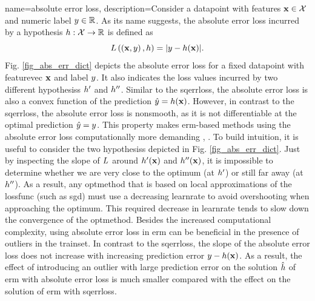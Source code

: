 {name={absolute error loss},
	description={Consider a \gls{datapoint} with \glspl{feature} ${\bf x} \in \mathcal{X}$ and numeric 
		\gls{label} $y \in \mathbb{R}$. As its name suggests, the absolute error \gls{loss} 
		incurred by a \gls{hypothesis} $h: \mathcal{X} \rightarrow \mathbb{R}$ 
		is defined as $$L\left(\left( {\bf x},y \right),h \right) = |y - h({\bf x})|.$$
		Fig. \ref{fig_abs_err_dict} depicts the absolute error \gls{loss} for a fixed \gls{datapoint} 
		with \gls{featurevec} ${\bf x}$ and \gls{label} $y$. It also indicates the \gls{loss} values 
		incurred by two different \glspl{hypothesis} $h'$ and $h''$. Similar to the \gls{sqerrloss}, 
		the absolute error \gls{loss} is also a \gls{convex} \gls{function} of the \gls{prediction} $\hat{y}=h({\bf x})$. 
		However, in contrast to the \gls{sqerrloss}, the absolute error \gls{loss} is \gls{nonsmooth}, as it is not 
		\gls{differentiable} at the optimal \gls{prediction} $\hat{y}=y$. This property 
		makes \gls{erm}-based methods using the absolute error \gls{loss} computationally more demanding \cite{nesterov04}, \cite{OptMLBook}. 
	    	To build intuition, it is useful to consider the two \glspl{hypothesis} depicted in Fig. \ref{fig_abs_err_dict}. 
	    	Just by inspecting the slope of $L$ around $h'({\bf x})$ and $h''({\bf x})$,
	     	it is impossible to determine whether we are very close to the optimum (at $h'$) or still far away (at $h''$). 
	     	As a result, any \gls{optmethod} that is based on local approximations of the \gls{lossfunc} (such as \gls{sgd}) 
	     	must use a decreasing \gls{learnrate} to avoid overshooting when approaching the optimum. This required 
	     	decrease in \gls{learnrate} tends to slow down the \gls{convergence} of the 
	     	\gls{optmethod}. Besides the increased computational complexity, using absolute error \gls{loss} in \gls{erm} can 
	     	be beneficial in the presence of \glspl{outlier} in the \gls{trainset}. In contrast to the \gls{sqerrloss}, 
	     	the slope of the absolute error \gls{loss} does not increase with increasing \gls{prediction} error 
	     	$y - h({\bf x})$. As a result, the effect of introducing an \gls{outlier} with 
	     	large \gls{prediction} error on the solution $\hat{h}$ of \gls{erm} with absolute error \gls{loss} 
	     	is much smaller compared with the effect on the solution of \gls{erm} with \gls{sqerrloss}. 
}}
